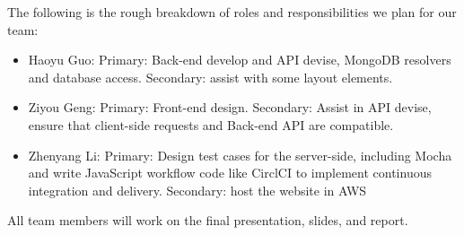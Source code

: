 The following is the rough breakdown of roles and responsibilities we plan for our team:
\begin{itemize}
\item Haoyu Guo: Primary: Back-end develop and API devise, MongoDB resolvers and database access.  Secondary: assist with some layout elements.
\item Ziyou Geng: Primary: Front-end design. Secondary: Assist in API devise, ensure that client-side requests and Back-end API are compatible.
\item Zhenyang Li: Primary: Design test cases for the server-side, including Mocha and write JavaScript workflow code like CirclCI to implement continuous integration and delivery. Secondary: host the website in AWS
\end{itemize}
All team members will work on the final presentation, slides, and report. 


 
